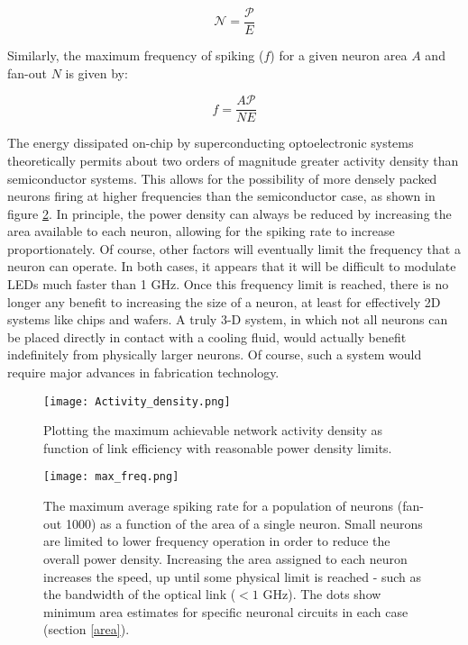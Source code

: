 \documentclass[twocolumn]{article}
\begin{document}
\begin{equation}
    \mathcal{N} = \frac{\mathcal{P}}{E}
    \label{activity_density}
\end{equation}

Similarly, the maximum frequency of spiking ($f$) for a given neuron area $A$ and fan-out $N$ is given by:

\begin{equation}
    f = \frac{A\mathcal{P}}{NE}
    \label{max_freq}
\end{equation}

The energy dissipated on-chip by superconducting optoelectronic systems theoretically permits about two orders of magnitude greater activity density than semiconductor systems. This allows for the possibility of more densely packed neurons firing at higher frequencies than the semiconductor case, as shown in figure \ref{fig:max_freq}. In principle, the power density can always be reduced by increasing the area available to each neuron, allowing for the spiking rate to increase proportionately. Of course, other factors will eventually limit the frequency that a neuron can operate. In both cases, it appears that it will be difficult to modulate LEDs much faster than 1 GHz. Once this frequency limit is reached, there is no longer any benefit to increasing the size of a neuron, at least for effectively 2D systems like chips and wafers. A truly 3-D system, in which not all neurons can be placed directly in contact with a cooling fluid, would actually benefit indefinitely from physically larger neurons. Of course, such a system would require major advances in fabrication technology.

\begin{figure}
    \centering
    \texttt{[image: Activity\_density.png]}
    \caption{Plotting the maximum achievable network activity density as function of link efficiency with reasonable power density limits.}
    \label{fig:activity_density}
\end{figure}

\begin{figure}
    \centering
    \texttt{[image: max\_freq.png]}
    \caption{The maximum average spiking rate for a population of neurons (fan-out 1000) as a function of the area of a single neuron. Small neurons are limited to lower frequency operation in order to reduce the overall power density. Increasing the area assigned to each neuron increases the speed, up until some physical limit is reached - such as the bandwidth of the optical link ($<1$ GHz). The dots show minimum area estimates for specific neuronal circuits in each case (section \ref{area}).}
    \label{fig:max_freq}
\end{figure}
\end{document}
